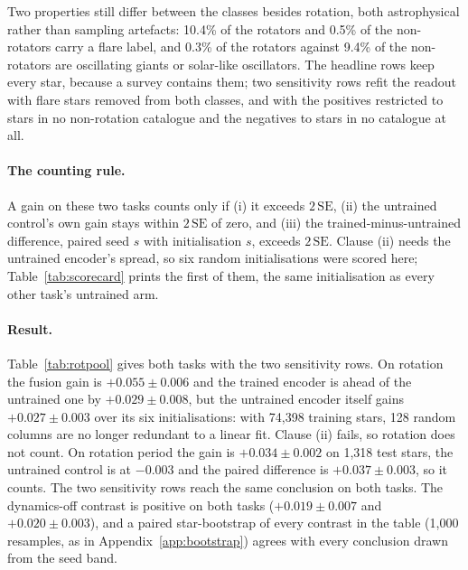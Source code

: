 \documentclass{article}
\begin{document}
Two properties still differ between the classes besides rotation, both astrophysical rather than
sampling artefacts: 10.4\% of the rotators and 0.5\% of the non-rotators carry a flare label, and
0.3\% of the rotators against 9.4\% of the non-rotators are oscillating giants or solar-like
oscillators. The headline rows keep every star, because a survey contains them; two sensitivity rows
refit the readout with flare stars removed from both classes, and with the positives restricted to
stars in no non-rotation catalogue and the negatives to stars in no catalogue at all.

\paragraph{The counting rule.} A gain on these two tasks counts only if (i) it exceeds
$2\,\mathrm{SE}$, (ii) the untrained control's own gain stays within $2\,\mathrm{SE}$ of zero, and
(iii) the trained-minus-untrained difference, paired seed $s$ with initialisation $s$, exceeds
$2\,\mathrm{SE}$. Clause (ii) needs the untrained encoder's spread, so six random initialisations
were scored here; Table~\ref{tab:scorecard} prints the first of them, the same initialisation as
every other task's untrained arm.

\paragraph{Result.} Table~\ref{tab:rotpool} gives both tasks with the two sensitivity rows. On
rotation the fusion gain is $+0.055 \pm 0.006$ and the trained encoder is ahead of the untrained one
by $+0.029 \pm 0.008$, but the untrained encoder itself gains $+0.027 \pm 0.003$ over its six
initialisations: with 74{,}398 training stars, 128 random columns are no longer redundant to a linear
fit. Clause (ii) fails, so rotation does not count. On rotation period the gain is $+0.034 \pm 0.002$
on 1{,}318 test stars, the untrained control is at $-0.003$ and the paired difference is
$+0.037 \pm 0.003$, so it counts. The two sensitivity rows reach the same conclusion on both tasks.
The dynamics-off contrast is positive on both tasks ($+0.019 \pm 0.007$ and $+0.020 \pm 0.003$), and
a paired star-bootstrap of every contrast in the table (1{,}000 resamples, as in
Appendix~\ref{app:bootstrap}) agrees with every conclusion drawn from the seed band.

\begin{table}[H]
\caption{The two rotation tasks on the rotation pool. The ``all stars'' rows are those of
Table~\ref{tab:scorecard}; linear and XGBoost readouts and the two supervised baselines are as there.
Gain = features\,$\oplus\,\mu$ minus features, mean over six encoder seeds, bold beyond
$2\,\mathrm{SE}$; untrained gain = the same with the untrained encoder. Sensitivity rows refit the
linear readout on the restricted population. $n$: test stars; prev.: rotator prevalence.}
\label{tab:rotpool}
\centering
\scriptsize

\end{table}
\end{document}
